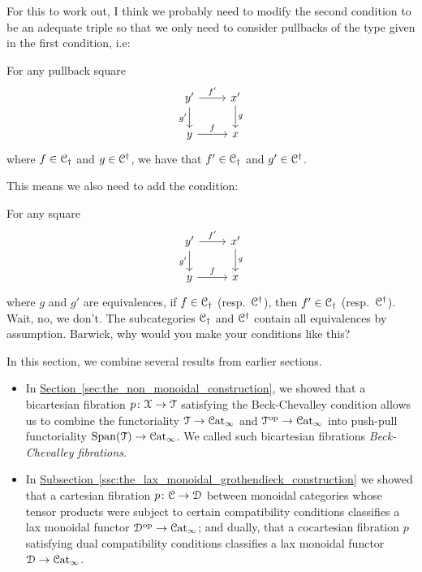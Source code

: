 \documentclass[main.tex]{subfiles}
\begin{document}
{\color{red}\begin{note}
  For this to work out, I think we probably need to modify the second condition to be an adequate triple so that we only need to consider pullbacks of the type given in the first condition, i.e:

  For any pullback square
  \begin{equation*}
    \begin{tikzcd}
      y'
      \arrow[r,  "f'"]
      \arrow[d, swap, "g'"]
      & x'
      \arrow[d, "g"]
      \\
      y
      \arrow[r, "f"]
      & x
    \end{tikzcd}
  \end{equation*}
  where $f \in \mathcal{C}_{\dagger}$ and $g \in \mathcal{C}^{\dagger}$, we have that $f' \in \mathcal{C}_{\dagger}$ and $g' \in \mathcal{C}^{\dagger}$.

  This means we also need to add the condition:

  For any square
  \begin{equation*}
    \begin{tikzcd}
      y'
      \arrow[r,  "f'"]
      \arrow[d, swap, "g'"]
      & x'
      \arrow[d, "g"]
      \\
      y
      \arrow[r, "f"]
      & x
    \end{tikzcd}
  \end{equation*}
  where $g$ and $g'$ are equivalences, if $f \in \mathcal{C}_{\dagger}$  (resp.\ $\mathcal{C}^{\dagger}$), then $f' \in \mathcal{C}_{\dagger}$ (resp.\ $\mathcal{C}^{\dagger}$). Wait, no, we don't. The subcategories $\mathcal{C}_{\dagger}$ and $\mathcal{C}^{\dagger}$ contain all equivalences by assumption. Barwick, why would you make your conditions like this?
\end{note}}

In this section, we combine several results from earlier sections.

\begin{itemize}
  \item In \hyperref[sec:the_non_monoidal_construction]{Section~\ref*{sec:the_non_monoidal_construction}}, we showed that a bicartesian fibration $p\colon \mathcal{X} \to \mathcal{T}$ satisfying the Beck-Chevalley condition allows us to combine the functoriality $\mathcal{T} \to \mathcal{C}\mathrm{at}_{\infty}$ and $\mathcal{T}^{\mathrm{op}} \to \mathcal{C}\mathrm{at}_{\infty}$ into push-pull functoriality $\mathrm{Span}(\mathcal{T}) \to \mathcal{C}\mathrm{at}_{\infty}$. We called such bicartesian fibrations \emph{Beck-Chevalley fibrations.}

  \item In \hyperref[ssc:the_lax_monoidal_grothendieck_construction]{Subsection~\ref*{ssc:the_lax_monoidal_grothendieck_construction}} we showed that a cartesian fibration $p\colon \mathcal{C} \to \mathcal{D}$ between monoidal categories whose tensor products were subject to certain compatibility conditions classifies a lax monoidal functor $\mathcal{D}^{\mathrm{op}} \to \mathcal{C}\mathrm{at}_{\infty}$; and dually, that a cocartesian fibration $p$ satisfying dual compatibility conditions classifies a lax monoidal functor $\mathcal{D} \to \mathcal{C}\mathrm{at}_{\infty}$.
\end{itemize}
\end{document}
